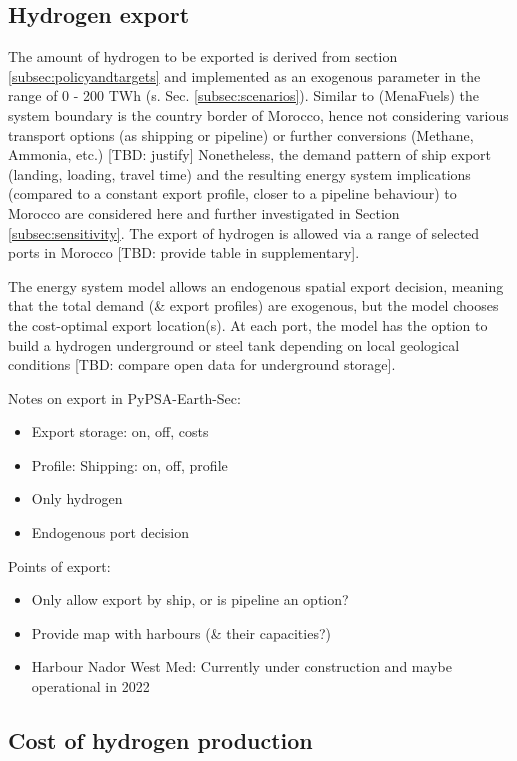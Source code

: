 \subsection{Hydrogen export}
\label{subsec:hydrogen_export}
The amount of hydrogen to be exported is derived from section \ref{subsec:policyandtargets} and implemented as an exogenous parameter in the range of 0 - 200 TWh (s. Sec. \ref{subsec:scenarios}). Similar to (MenaFuels) \cite{Ersoy2022} the system boundary is the country border of Morocco, hence not considering various transport options (as shipping or pipeline) or further conversions (Methane, Ammonia, etc.) [TBD: justify]
Nonetheless, the demand pattern of ship export (landing, loading, travel time) and the resulting energy system implications (compared to a constant export profile, closer to a pipeline behaviour) to Morocco are considered here and further investigated in Section \ref{subsec:sensitivity}.
The export of hydrogen is allowed via a range of selected ports in Morocco [TBD: provide table in supplementary]. 

The energy system model allows an endogenous spatial export decision, meaning that the total demand (& export profiles) are exogenous, but the model chooses the  cost-optimal export location(s). At each port, the model has the option to build a hydrogen underground or steel tank depending on local geological conditions [TBD: compare open data for underground storage].

Notes on export in PyPSA-Earth-Sec:
\begin{itemize}
    \item Export storage: on, off, costs
    \item Profile: Shipping: on, off, profile
    \item Only hydrogen
    \item Endogenous port decision
\end{itemize}

Points of export:
\begin{itemize}
    \item Only allow export by ship, or is pipeline an option?
    \item Provide map with harbours (\& their capacities?)
    \item Harbour Nador West Med: Currently under construction and maybe operational in 2022 \cite{Ersoy2022}
\end{itemize}


\subsection{Cost of hydrogen production}
\label{subsec:cost_of_hydrogen_production}

